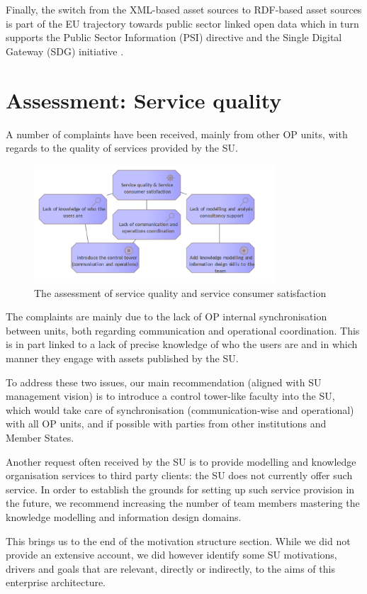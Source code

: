     Finally, the switch from the XML-based asset sources to RDF-based asset sources is part of the EU trajectory towards public sector linked open data which in turn supports the Public Sector Information (PSI) directive \citep{directive-2019/1024} and the Single Digital Gateway (SDG) initiative \citep{directive-2018/1724}.
    

	\section{Assessment: Service quality}

    A number of complaints have been received, mainly from other OP units, with regards to the quality of services provided by the SU. 

	\begin{figure}[h]
		\centering
		\includegraphics[width=0.8\textwidth]{images/motivation/Service quality.png}
		\caption{The assessment of service quality and service consumer satisfaction}
		\label{fig:service-quality}
	\end{figure}
	
	The complaints are mainly due to the lack of OP internal synchronisation between units, both regarding communication and operational coordination. This is in part linked to a lack of precise knowledge of who the users are and in which manner they engage with assets published by the SU. 
	
	
	To address these two issues, our main recommendation (aligned with SU management vision) is to introduce a control tower-like faculty into the SU, which would take care of synchronisation (communication-wise and operational) with all OP units, and if possible with parties from other institutions and Member States.
	
	Another request often received by the SU is to provide modelling and knowledge organisation services to third party clients: the SU does not currently offer such service. In order to establish the grounds for setting up such service provision in the future, we recommend increasing the number of team members mastering the knowledge modelling and information design domains. 
	
	This brings us to the end of the motivation structure section. While we did not provide an extensive account, we did however identify some SU motivations, drivers and goals that are relevant, directly or indirectly, to the aims of this enterprise architecture.